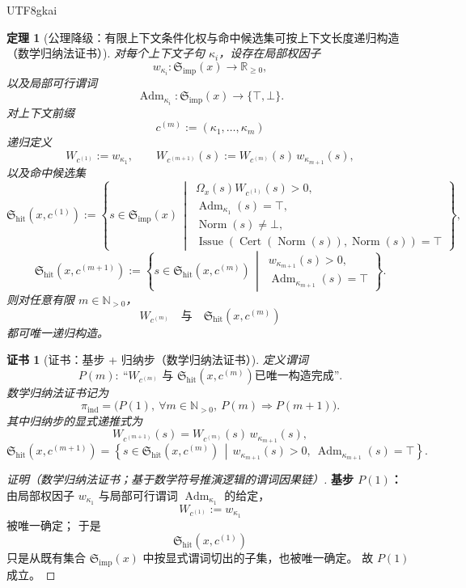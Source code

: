 \documentclass[12pt]{article}
\newtheorem{theorem}{定理}[section]
\newtheorem{Certificate}{证书}[section]
\newcommand{\NN}{\mathbb{N}}
\newcommand{\Norm}{\operatorname{Norm}}
\newcommand{\Cert}{\operatorname{Cert}}
\newcommand{\Issue}{\operatorname{Issue}}
\begin{document}
\begin{CJK*}{UTF8}{gkai}
\begin{theorem}[公理降级：有限上下文条件化权与命中候选集可按上下文长度递归构造（数学归纳法证书）]
\label{thm:tex37-ch15-conditioning}
对每个上下文子句 $\kappa_i$，设存在局部权因子
\[
  w_{\kappa_i}:\mathfrak S_{\mathrm{imp}}(x)\to \mathbb R_{\ge 0},
\]
以及局部可行谓词
\[
  \operatorname{Adm}_{\kappa_i}:\mathfrak S_{\mathrm{imp}}(x)\to\{\top,\bot\}.
\]
对上下文前缀
\[
  c^{(m)}:=(\kappa_1,\dots,\kappa_m)
\]
递归定义
\[
  W_{c^{(1)}}:=w_{\kappa_1},
  \qquad
  W_{c^{(m+1)}}(s):=W_{c^{(m)}}(s)\,w_{\kappa_{m+1}}(s),
\]
以及命中候选集
\[
  \mathfrak S_{\mathrm{hit}}(x,c^{(1)})
  :=
  \left\{
    s\in\mathfrak S_{\mathrm{imp}}(x)
    \,\middle|\,
    \begin{array}{l}
      \Omega_x(s)W_{c^{(1)}}(s)>0,\\
      \operatorname{Adm}_{\kappa_1}(s)=\top,\\
      \Norm(s)\neq\bot,\\
      \Issue(\Cert(\Norm(s)),\Norm(s))=\top
    \end{array}
  \right\},
\]
\[
  \mathfrak S_{\mathrm{hit}}(x,c^{(m+1)})
  :=
  \left\{
    s\in \mathfrak S_{\mathrm{hit}}(x,c^{(m)})
    \,\middle|\,
    \begin{array}{l}
      w_{\kappa_{m+1}}(s)>0,\\
      \operatorname{Adm}_{\kappa_{m+1}}(s)=\top
    \end{array}
  \right\}.
\]
则对任意有限 $m\in\NN_{>0}$，
\[
  W_{c^{(m)}}\quad\text{与}\quad \mathfrak S_{\mathrm{hit}}(x,c^{(m)})
\]
都可唯一递归构造。
\end{theorem}

\begin{Certificate}[证书：基步 + 归纳步（数学归纳法证书）]
\label{cert:tex37-ch15-conditioning}
定义谓词
\[
  P(m):\ \text{“}W_{c^{(m)}}\text{ 与 }\mathfrak S_{\mathrm{hit}}(x,c^{(m)})\text{已唯一构造完成”}.
\]
数学归纳法证书记为
\[
  \pi_{\mathrm{ind}}
  =
  \bigl(P(1),\ \forall m\in\NN_{>0},\ P(m)\Rightarrow P(m+1)\bigr).
\]
其中归纳步的显式递推式为
\[
  W_{c^{(m+1)}}(s)=W_{c^{(m)}}(s)\,w_{\kappa_{m+1}}(s),
\]
\[
  \mathfrak S_{\mathrm{hit}}(x,c^{(m+1)})
  =
  \left\{
    s\in \mathfrak S_{\mathrm{hit}}(x,c^{(m)})
    \,\middle|\,
    w_{\kappa_{m+1}}(s)>0,\ \operatorname{Adm}_{\kappa_{m+1}}(s)=\top
  \right\}.
\]
\end{Certificate}

\begin{proof}[证明（数学归纳法证书；基于数学符号推演逻辑的谓词因果链）]
\textbf{基步 $P(1)$：}
由局部权因子 $w_{\kappa_1}$ 与局部可行谓词 $\operatorname{Adm}_{\kappa_1}$ 的给定，
\[
  W_{c^{(1)}}:=w_{\kappa_1}
\]
被唯一确定；
于是
\[
  \mathfrak S_{\mathrm{hit}}(x,c^{(1)})
\]
只是从既有集合 $\mathfrak S_{\mathrm{imp}}(x)$ 中按显式谓词切出的子集，也被唯一确定。
故 $P(1)$ 成立。


\end{proof}
\end{CJK*}
\end{document}
